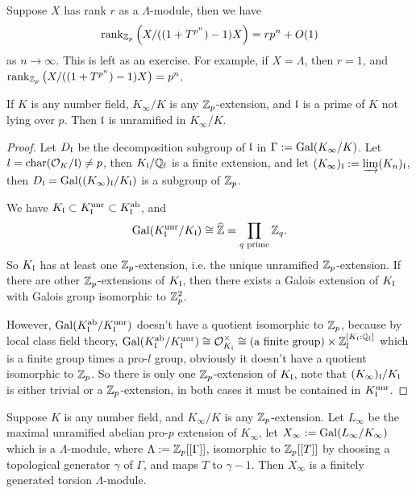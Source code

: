 \begin{lem}\label{p:rank-growth}
Suppose $X$ has rank $r$ as a $\Lambda$-module,
then we have
$$
\operatorname{rank}_{{\mathbb {Z}}_p}\left(X/((1+T^{p^n})-1)X\right)=rp^n+O(1)
$$
as $n\to\infty$. This is left as an exercise.
For example, if $X=\Lambda$, then $r=1$,
and $\operatorname{rank}_{{\mathbb {Z}}_p}\big(X/((1+T^{p^n})-1)X\big)=p^n$.
\end{lem}

\begin{prop}\label{p:unr-outside-p}
If $K$ is any number field, $K_\infty/K$ is any ${\mathbb {Z}}_p$-extension,
and ${\mathfrak{l}}$ is a prime of $K$ not lying over $p$. Then ${\mathfrak{l}}$ is unramified in $K_\infty/K$.
\end{prop}

\begin{proof}
Let $D_{\mathfrak{l}}$ be the decomposition subgroup of ${\mathfrak{l}}$ in $\Gamma:={\mathrm{Gal}}(K_\infty/K)$.
Let $l=\operatorname{char}({\mathcal {O}}_K/{\mathfrak{l}})\neq p$, then $K_{\mathfrak{l}}/{\mathbb {Q}}_l$ is a finite extension,
and let $(K_\infty)_{\mathfrak{l}}:=\varinjlim(K_n)_{\mathfrak{l}}$, then
$D_{\mathfrak{l}}={\mathrm{Gal}}((K_\infty)_{\mathfrak{l}}/K_{\mathfrak{l}})$ is a subgroup of ${\mathbb {Z}}_p$.

We have $K_{\mathfrak{l}}\subset K_{\mathfrak{l}}^{\mathrm{unr}}\subset K_{\mathfrak{l}}^{\mathrm{ab}}$,
and
$$
{\mathrm{Gal}}(K_{\mathfrak{l}}^{\mathrm{unr}}/K_{\mathfrak{l}})\cong\widehat{{\mathbb {Z}}}
=\prod_{q\text{ prime}}{\mathbb {Z}}_q.
$$
So $K_{\mathfrak{l}}$ has at least one ${\mathbb {Z}}_p$-extension, i.e. the unique unramified
${\mathbb {Z}}_p$-extension. If there are other ${\mathbb {Z}}_p$-extensions of $K_{\mathfrak{l}}$,
then there exists a Galois extension of $K_{\mathfrak{l}}$ with Galois group
isomorphic to ${\mathbb {Z}}_p^2$.

However, ${\mathrm{Gal}}(K_{\mathfrak{l}}^{\mathrm{ab}}/K_{\mathfrak{l}}^{\mathrm{unr}})$
doesn't have a quotient isomorphic to ${\mathbb {Z}}_p$, because by
local class field theory,
${\mathrm{Gal}}(K_{\mathfrak{l}}^{\mathrm{ab}}/K_{\mathfrak{l}}^{\mathrm{unr}})\cong{\mathcal {O}}_{K_{\mathfrak{l}}}^\times\cong
(\text{a finite group})\times{\mathbb {Z}}_l^{[K_{\mathfrak{l}}:{\mathbb {Q}}_l]}$ which is a finite group
times a pro-$l$ group, obviously it doesn't have a quotient isomorphic to ${\mathbb {Z}}_p$.
So there is only one ${\mathbb {Z}}_p$-extension of $K_{\mathfrak{l}}$,
note that $(K_\infty)_{\mathfrak{l}}/K_{\mathfrak{l}}$ is either trivial or a ${\mathbb {Z}}_p$-extension,
in both cases it must be contained in $K_{\mathfrak{l}}^{\mathrm{unr}}$.
\end{proof}

\begin{thm}[Iwasawa]\label{p:f-g-torsion2}
Suppose $K$ is any number field, and $K_\infty/K$ is any ${\mathbb {Z}}_p$-extension.
Let $L_\infty$ be the maximal unramified abelian pro-$p$ extension of $K_\infty$,
let $X_\infty:={\mathrm{Gal}}(L_\infty/K_\infty)$ which is a $\Lambda$-module,
where $\Lambda:={\mathbb {Z}}_p[[\Gamma]]$, isomorphic to ${\mathbb {Z}}_p[[T]]$
by choosing a topological generator $\gamma$ of $\Gamma$,
and maps $T$ to $\gamma-1$. Then $X_\infty$ is a finitely generated torsion
$\Lambda$-module.
\end{thm}

